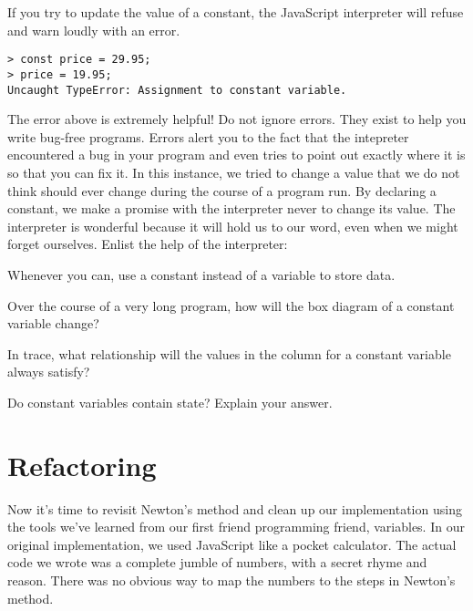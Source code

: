 If you try to update the value of a constant, the JavaScript interpreter will refuse and warn loudly with an error.

\begin{lstlisting}
> const price = 29.95;
> price = 19.95;
Uncaught TypeError: Assignment to constant variable.
\end{lstlisting}

The error above is extremely helpful! Do not ignore errors. They exist to help you write bug-free programs. Errors alert you to the fact that the intepreter encountered a bug in your program and even tries to point out exactly where it is so that you can fix it. In this instance, we tried to change a value that we do not think should ever change during the course of a program run. By declaring a constant, we make a promise with the interpreter never to change its value. The interpreter is wonderful because it will hold us to our word, even when we might forget ourselves. Enlist the help of the interpreter:

\begin{center}
  Whenever you can, use a constant instead of a variable to store data.
\end{center}

\begin{question}
  Over the course of a very long program, how will the box diagram of a constant variable change?
\end{question}

\begin{question}
  In trace, what relationship will the values in the column for a constant variable always satisfy?
\end{question}

\begin{question}
  Do constant variables contain state? Explain your answer.
\end{question}


\section{Refactoring}
Now it's time to revisit Newton's method and clean up our implementation using the tools we've learned from our first friend programming friend, variables. In our original implementation, we used JavaScript like a pocket calculator. The actual code we wrote was a complete jumble of numbers, with a secret rhyme and reason. There was no obvious way to map the numbers to the steps in Newton's method.

